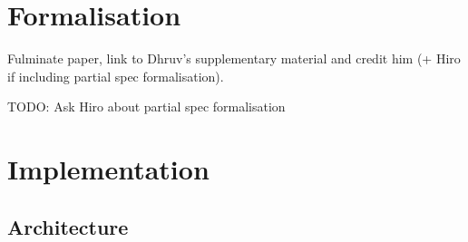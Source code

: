 \documentclass[withindex,glossary]{cam-thesis}
\begin{document}
\chapter{Formalisation}

Fulminate paper, link to Dhruv's supplementary material and credit him (+ Hiro if including partial spec formalisation).

TODO: Ask Hiro about partial spec formalisation

\chapter{Implementation}\label{chap:impl}

\section{Architecture}
\end{document}
